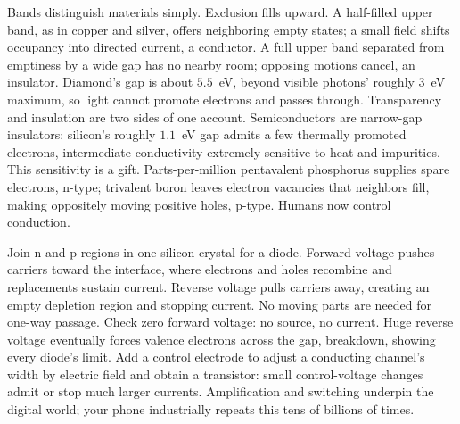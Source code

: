 Bands distinguish materials simply. Exclusion fills upward. A half-filled upper band, as in copper and silver, offers neighboring empty states; a small field shifts occupancy into directed current, a conductor. A full upper band separated from emptiness by a wide gap has no nearby room; opposing motions cancel, an insulator. Diamond's gap is about \(5.5\)~eV, beyond visible photons' roughly \(3\)~eV maximum, so light cannot promote electrons and passes through. Transparency and insulation are two sides of one account. Semiconductors are narrow-gap insulators: silicon's roughly \(1.1\)~eV gap admits a few thermally promoted electrons, intermediate conductivity extremely sensitive to heat and impurities. This sensitivity is a gift. Parts-per-million pentavalent phosphorus supplies spare electrons, n-type; trivalent boron leaves electron vacancies that neighbors fill, making oppositely moving positive holes, p-type. Humans now control conduction.

Join n and p regions in one silicon crystal for a diode. Forward voltage pushes carriers toward the interface, where electrons and holes recombine and replacements sustain current. Reverse voltage pulls carriers away, creating an empty depletion region and stopping current. No moving parts are needed for one-way passage. Check zero forward voltage: no source, no current. Huge reverse voltage eventually forces valence electrons across the gap, breakdown, showing every diode's limit. Add a control electrode to adjust a conducting channel's width by electric field and obtain a transistor: small control-voltage changes admit or stop much larger currents. Amplification and switching underpin the digital world; your phone industrially repeats this tens of billions of times.

